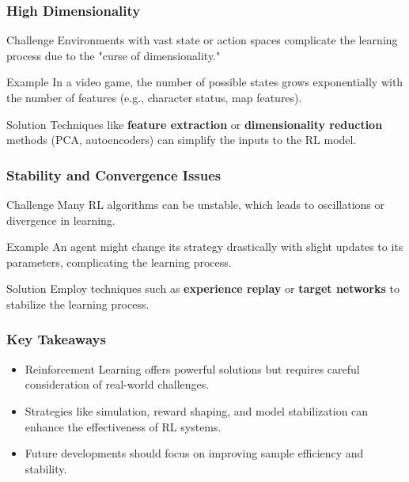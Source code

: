 \documentclass{beamer}
\begin{document}
\begin{frame}[fragile]
    \frametitle{High Dimensionality}
    \begin{block}{Challenge}
        Environments with vast state or action spaces complicate the learning process due to the "curse of dimensionality."
    \end{block}
    \begin{block}{Example}
        In a video game, the number of possible states grows exponentially with the number of features (e.g., character status, map features).
    \end{block}
    \begin{block}{Solution}
        Techniques like \textbf{feature extraction} or \textbf{dimensionality reduction} methods (PCA, autoencoders) can simplify the inputs to the RL model.
    \end{block}
\end{frame}

\begin{frame}[fragile]
    \frametitle{Stability and Convergence Issues}
    \begin{block}{Challenge}
        Many RL algorithms can be unstable, which leads to oscillations or divergence in learning.
    \end{block}
    \begin{block}{Example}
        An agent might change its strategy drastically with slight updates to its parameters, complicating the learning process.
    \end{block}
    \begin{block}{Solution}
        Employ techniques such as \textbf{experience replay} or \textbf{target networks} to stabilize the learning process.
    \end{block}
\end{frame}

\begin{frame}[fragile]
    \frametitle{Key Takeaways}
    \begin{itemize}
        \item Reinforcement Learning offers powerful solutions but requires careful consideration of real-world challenges.
        \item Strategies like simulation, reward shaping, and model stabilization can enhance the effectiveness of RL systems.
        \item Future developments should focus on improving sample efficiency and stability.
    \end{itemize}
\end{frame}
\end{document}
